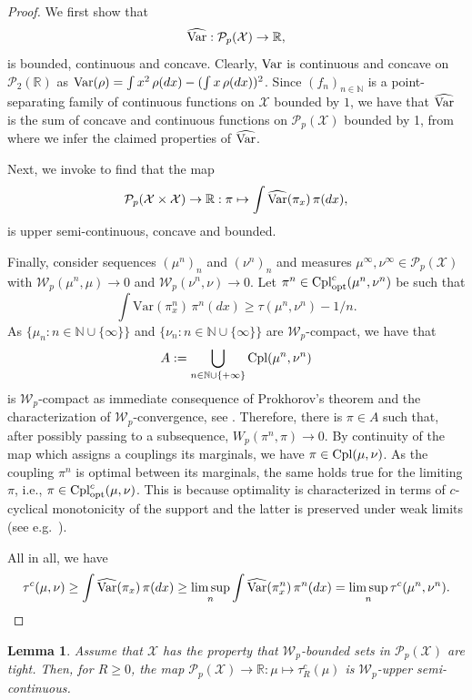 \documentclass[a4paper]{amsart}
\numberwithin{theorem}{section}
\newtheorem{lemma}[theorem]{Lemma}
\theoremstyle{definition}
\newcommand{\N}{\mathbb{N}}
\newcommand{\R}{\mathbb{R}}
\newcommand{\cpl}{\textup{Cpl}}
\newcommand{\W}{\mathcal{W}}
\newcommand{\Pc}{\mathcal P}
\newcommand{\cplopt}{\cpl_{\rm opt}}
\newcommand{\var}[1]{\mathrm{Var}(#1)}
\begin{document}
\begin{proof}
We first show that
\[
\widehat{\rm Var} : \Pc_p(\mathcal X) \to \R,
\]
is bounded, continuous and concave.
Clearly, ${\rm Var}$ is continuous and concave on $\Pc_2(\R)$ as ${\rm Var}(\rho) = \int x^2 \, \rho(dx) - (\int x \, \rho(dx))^2$.
Since $(f_n)_{n \in \N}$ is a point-separating family of continuous functions on $\mathcal X$ bounded by $1$, we have that $\widehat{\rm Var}$ is the sum of concave and continuous functions on $\Pc_p(\mathcal X)$ bounded by 1, from where we infer the claimed properties of $\widehat{\rm Var}$.

Next, we invoke \cite[Proposition 2.8]{BaBePa18} to find that the map
\[
    \Pc_p(\mathcal X \times \mathcal X) \to \R : \pi \mapsto \int \widehat{\rm Var}(\pi_x) \, \pi(dx),
\]
is upper semi-continuous, concave and bounded.

Finally, consider sequences $(\mu^n)_n$ and $(\nu^n)_n$ and measures $\mu^\infty, \nu^\infty \in \Pc_p(\mathcal X)$ with $\W_p(\mu^n,\mu) \to 0$ and $\W_p(\nu^n,\nu) \to 0$. Let $\pi^n \in \cplopt^c(\mu^n,\nu^n)$ be such that 
\[
\int \var{\pi^n_x} \, \pi^n(dx) \ge \tau(\mu^n,\nu^n) - 1/n.
\]
As $\{ \mu_n : n \in \N \cup \{\infty\}\}$ and $\{ \nu_n : n \in \N \cup \{\infty\}\}$ are $\W_p$-compact, we have that
\[
A: = \bigcup_{n \in \N \cup \{+\infty \} } \cpl(\mu^n,\nu^n)
\]
is $\W_p$-compact as immediate consequence of Prokhorov's theorem and the characterization of $\W_p$-convergence, see \cite[Definition 6.8]{Vi09}. Therefore, there is $\pi \in A$ such that, after possibly passing to a subsequence, $W_p(\pi^n, \pi) \to 0$. By continuity of the map which assigns a couplings its marginals, we have $\pi \in \cpl(\mu,\nu)$. As the coupling $\pi^n$ is optimal between its marginals, the same holds true for the limiting $\pi$, i.e., $\pi \in \cplopt^c(\mu,\nu)$. This is because optimality is characterized in terms of $c$-cyclical monotonicity of the support and the latter is preserved under weak limits (see e.g.\ \cite[Theorem 5.20]{Vi09}). 

All in all, we have 
\[
\tau^c(\mu,\nu) \ge \int \widehat{\rm Var}(\pi_x) \, \pi(dx) \ge \limsup_n \int \widehat{\rm Var}(\pi^n_x) \,  \pi^n(dx) = \limsup_n \tau^c(\mu^n,\nu^n). \qedhere 
\]
\end{proof}

\begin{lemma} \label{lem:apx.tauRusc}
    Assume that $\mathcal X$ has the property that $\mathcal W_p$-bounded sets in $\Pc_p(\mathcal X)$ are tight.
    Then, for $R \ge 0$, the map $\Pc_p(\mathcal X) \to \R : \mu \mapsto \tau_R^c(\mu)$ is $\W_p$-upper semi-continuous.
\end{lemma}
\end{document}
